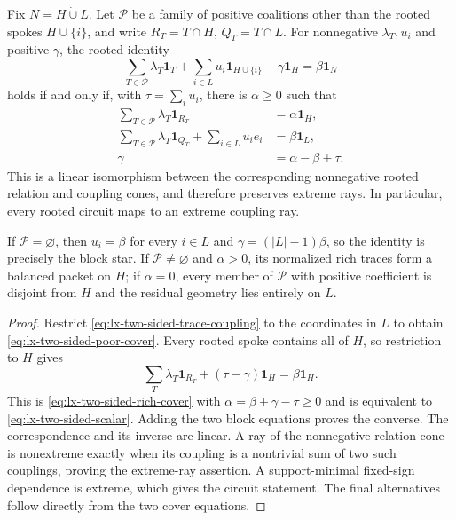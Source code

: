 \begin{theorem}
\label{thm:lx-two-sided-trace-coupling}
Fix $N=H\mathbin{\dot\cup}L$.  Let $\mathcal P$ be a family of positive
coalitions other than the rooted spokes $H\cup\{i\}$, and write
$R_T=T\cap H$, $Q_T=T\cap L$.  For nonnegative $\lambda_T,u_i$ and positive
$\gamma$, the rooted identity
\[
 \sum_{T\in\mathcal P}\lambda_T\mathbf1_T
 +\sum_{i\in L}u_i\mathbf1_{H\cup\{i\}}
 -\gamma\mathbf1_H=\beta\mathbf1_N                 \tag{TC}
 \label{eq:lx-two-sided-trace-coupling}
\]
holds if and only if, with $\tau=\sum_i u_i$, there is $\alpha\geq0$ such
that
\begin{align}
 \sum_{T\in\mathcal P}\lambda_T\mathbf1_{R_T}
   &=\alpha\mathbf1_H,                              \tag{TC-H}
   \label{eq:lx-two-sided-rich-cover}\\
 \sum_{T\in\mathcal P}\lambda_T\mathbf1_{Q_T}
   +\sum_{i\in L}u_i e_i
   &=\beta\mathbf1_L,                               \tag{TC-L}
   \label{eq:lx-two-sided-poor-cover}\\
 \gamma&=\alpha-\beta+\tau.                        \tag{TC-S}
   \label{eq:lx-two-sided-scalar}
\end{align}
This is a linear isomorphism between the corresponding nonnegative rooted
relation and coupling cones, and therefore preserves extreme rays.  In
particular, every rooted circuit maps to an extreme coupling ray.

If $\mathcal P=\varnothing$, then $u_i=\beta$ for every $i\in L$ and
$\gamma=(|L|-1)\beta$, so the identity is precisely the block star.  If
$\mathcal P\ne\varnothing$ and $\alpha>0$, its normalized rich traces form a
balanced packet on $H$; if $\alpha=0$, every member of $\mathcal P$ with
positive coefficient is disjoint from $H$ and the residual geometry lies
entirely on $L$.
\end{theorem}

\begin{proof}
Restrict \eqref{eq:lx-two-sided-trace-coupling} to the coordinates in $L$ to
obtain \eqref{eq:lx-two-sided-poor-cover}.  Every rooted spoke contains all
of $H$, so restriction to $H$ gives
\[
 \sum_T\lambda_T\mathbf1_{R_T}+(\tau-\gamma)\mathbf1_H
 =\beta\mathbf1_H.
\]
This is \eqref{eq:lx-two-sided-rich-cover} with
$\alpha=\beta+\gamma-\tau\geq0$ and is equivalent to
\eqref{eq:lx-two-sided-scalar}.  Adding the two block equations proves the
converse.  The correspondence and its inverse are linear.  A ray of the
nonnegative relation cone is nonextreme exactly when its coupling is a
nontrivial sum of two such couplings, proving the extreme-ray assertion.  A
support-minimal fixed-sign dependence is extreme, which gives the circuit
statement.  The final alternatives follow directly from the two cover
equations.
\end{proof}

